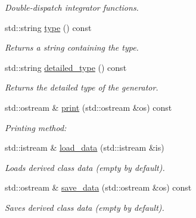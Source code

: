 \begin{DoxyCompactItemize}
\begin{DoxyCompactList}\small\item\em Double-\/dispatch integrator functions. \end{DoxyCompactList}\item 
\hypertarget{a00001_a732addc9e3db0cef6f0fa49c98ebdae3}{std\-::string \hyperlink{a00001_a732addc9e3db0cef6f0fa49c98ebdae3}{type} () const }\label{a00001_a732addc9e3db0cef6f0fa49c98ebdae3}

\begin{DoxyCompactList}\small\item\em Returns a string containing the type. \end{DoxyCompactList}\item 
\hypertarget{a00001_ab94b86df443a389e480c5d7f845e6523}{std\-::string \hyperlink{a00001_ab94b86df443a389e480c5d7f845e6523}{detailed\-\_\-type} () const }\label{a00001_ab94b86df443a389e480c5d7f845e6523}

\begin{DoxyCompactList}\small\item\em Returns the detailed type of the generator. \end{DoxyCompactList}\item 
\hypertarget{a00001_a7d4a9a3ad7c7f1e076a890201a963e5f}{std\-::ostream \& \hyperlink{a00001_a7d4a9a3ad7c7f1e076a890201a963e5f}{print} (std\-::ostream \&os) const }\label{a00001_a7d4a9a3ad7c7f1e076a890201a963e5f}

\begin{DoxyCompactList}\small\item\em Printing method\-: \end{DoxyCompactList}\item 
\hypertarget{a00001_a109612e2e98a9ad3ee9dbd6d3a87c994}{std\-::istream \& \hyperlink{a00001_a109612e2e98a9ad3ee9dbd6d3a87c994}{load\-\_\-data} (std\-::istream \&is)}\label{a00001_a109612e2e98a9ad3ee9dbd6d3a87c994}

\begin{DoxyCompactList}\small\item\em Loads derived class data (empty by default). \end{DoxyCompactList}\item 
\hypertarget{a00001_a2ee0363b66b4a867bd5afc8b0a692fc0}{std\-::ostream \& \hyperlink{a00001_a2ee0363b66b4a867bd5afc8b0a692fc0}{save\-\_\-data} (std\-::ostream \&os) const }\label{a00001_a2ee0363b66b4a867bd5afc8b0a692fc0}

\begin{DoxyCompactList}\small\item\em Saves derived class data (empty by default). \end{DoxyCompactList}\end{DoxyCompactItemize}
